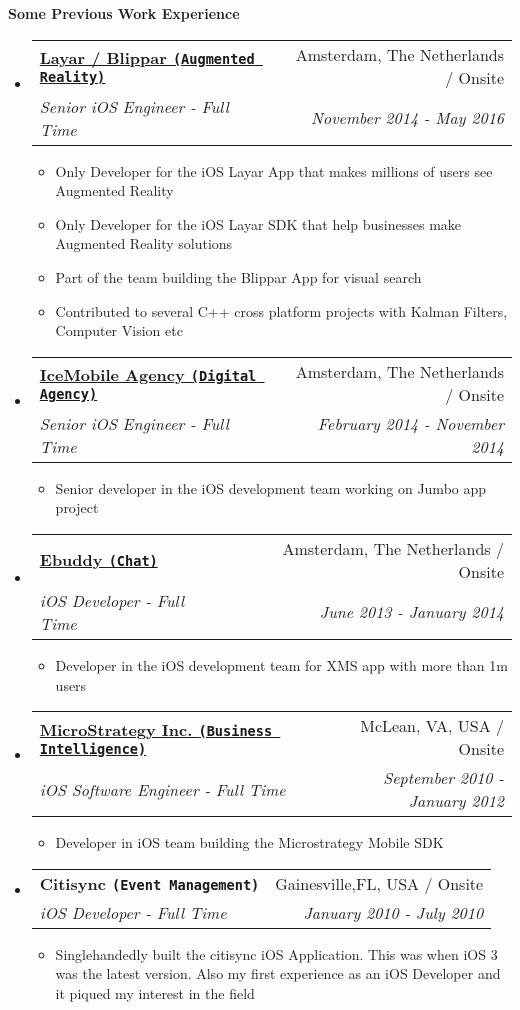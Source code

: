 \documentclass[letterpaper,11pt]{article}
\makeatletter
\newcommand{\resitem}[1]{\item #1 \vspace{-2pt}}
\newcommand{\resheading}[1]{{\large \colorbox{mygrey}{\begin{minipage}{\textwidth}{\textbf{#1 \vphantom{p\^{E}}}}\end{minipage}}}}
\newcommand{\ressubheading}[4]{
\begin{tabular*}{7.0in}{l@{\extracolsep{\fill}}r}
    \textbf{#1} & #2 \\
    \textit{#3} & \textit{#4} \\
\end{tabular*}\vspace{-6pt}}
\makeatother
\begin{document}
\resheading{Some Previous Work Experience}
\begin{itemize}

\item
    \ressubheading{\href{https://www.layar.com/}{Layar / Blippar \texttt{(Augmented Reality)}}}{Amsterdam, The Netherlands / Onsite}{Senior iOS Engineer - Full Time}{November 2014 - May 2016}
    \begin{itemize}
        \resitem{Only Developer for the iOS Layar App that makes millions of users see Augmented Reality}
        \resitem{Only Developer for the iOS Layar SDK that help businesses make Augmented Reality solutions}
        \resitem{Part of the team building the Blippar App for visual search}
        \resitem{Contributed to several C++ cross platform projects with Kalman Filters, Computer Vision etc}
    \end{itemize}

\item
    \ressubheading{\href{http://www.icemobile.com}{IceMobile Agency \texttt{(Digital Agency)}}}{Amsterdam, The Netherlands / Onsite}{Senior iOS Engineer - Full Time}{February 2014 - November 2014}
    \begin{itemize}
        \resitem{Senior developer in the iOS development team working on Jumbo app project}
    \end{itemize}

\item
    \ressubheading{\href{http://www.ebuddy.com}{Ebuddy \texttt{(Chat)}}}{Amsterdam, The Netherlands / Onsite}{iOS Developer - Full Time}{June 2013 - January 2014}
    \begin{itemize}
        \resitem{Developer in the iOS development team for XMS app with more than 1m users}
    \end{itemize}

\item
    \ressubheading{\href{http://www.microstrategy.com/Company}{MicroStrategy Inc. \texttt{(Business Intelligence)}}}{McLean, VA, USA / Onsite}{iOS Software Engineer - Full Time}{September 2010 - January 2012}
    \begin{itemize}
        \resitem{Developer in iOS team building the Microstrategy Mobile SDK}
    \end{itemize}
    

\item
    \ressubheading{Citisync \texttt{(Event Management)}}{Gainesville,FL, USA / Onsite}{iOS Developer - Full Time}{January 2010 - July 2010}
    \begin{itemize}
        \resitem{Singlehandedly built the citisync iOS Application. This was when iOS 3 was the latest version. Also my first experience as an iOS Developer and it piqued my interest in the field}
    \end{itemize}
                

\end{itemize}
\end{document}
